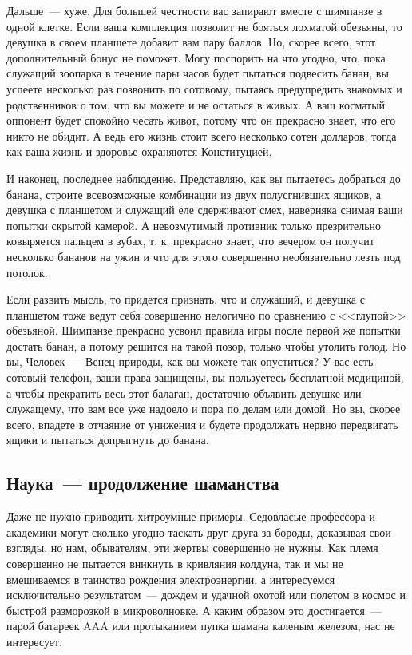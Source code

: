 \documentclass{scrbook}
\newcommand{\flqq}{<<}
\newcommand{\frqq}{>>}
\newcommand{\mdash}{~--- }
\newcommand{\essaysection}[1]{\subsection*{#1}\nopagebreak}
\begin{document}
Дальше{\mdash}хуже. Для большей честности вас запирают вместе с шимпанзе в одной клетке. Если ваша комплекция позволит не бояться лохматой обезьяны, то девушка в своем планшете добавит вам пару баллов. Но, скорее всего, этот дополнительный бонус не поможет. Могу поспорить на что угодно, что, пока служащий зоопарка в течение пары часов будет пытаться подвесить банан, вы успеете несколько раз позвонить по сотовому, пытаясь предупредить знакомых и родственников о том, что вы можете и не остаться в живых. А ваш косматый оппонент будет спокойно чесать живот, потому что он прекрасно знает, что его никто не обидит. А ведь его жизнь стоит всего несколько сотен долларов, тогда как ваша жизнь и здоровье охраняются Конституцией.

И наконец, последнее наблюдение. Представляю, как вы пытаетесь добраться до банана, строите всевозможные комбинации из двух полусгнивших ящиков, а девушка с планшетом и служащий еле сдерживают смех, наверняка снимая ваши попытки скрытой камерой. А невозмутимый противник только презрительно ковыряется пальцем в зубах, т. к. прекрасно знает, что вечером он получит несколько бананов на ужин и что для этого совершенно необязательно лезть под потолок.

Если развить мысль, то придется признать, что и служащий, и девушка с планшетом тоже ведут себя совершенно нелогично по сравнению с {\flqq}глупой{\frqq} обезьяной. Шимпанзе прекрасно усвоил правила игры после первой же попытки достать банан, а потому решится на такой позор, только чтобы утолить голод. Но вы, Человек{\mdash}Венец природы, как вы можете так опуститься? У вас есть сотовый телефон, ваши права защищены, вы пользуетесь бесплатной медициной, а чтобы прекратить весь этот балаган, достаточно объявить девушке или служащему, что вам все уже надоело и пора по делам или домой. Но вы, скорее всего, впадете в отчаяние от унижения и будете продолжать нервно передвигать ящики и пытаться допрыгнуть до банана.

\essaysection{Наука{\mdash}продолжение шаманства}

Даже не нужно приводить хитроумные примеры. Седовласые профессора и академики могут сколько угодно таскать друг друга за бороды, доказывая свои взгляды, но нам, обывателям, эти жертвы совершенно не нужны. Как племя совершенно не пытается вникнуть в кривляния колдуна, так и мы не вмешиваемся в таинство рождения электроэнергии, а интересуемся исключительно результатом{\mdash}дождем и удачной охотой или полетом в космос и быстрой разморозкой в микроволновке. А каким образом это достигается{\mdash}парой батареек AAA или протыканием пупка шамана каленым железом, нас не интересует.
\end{document}

